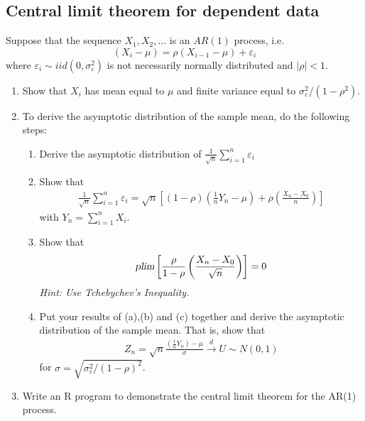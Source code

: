 \documentclass{article}
\begin{document}
\subsection{Central limit theorem for dependent data}
Suppose that the sequence $X_{1},X_{2},\ldots $ is an $AR(1)$ process, i.e.
$$\left( X_{i}-\mu \right) =\rho \left( X_{i-1}-\mu \right) +\varepsilon _{i}$$
where $\varepsilon _{i}\sim iid(0,\sigma _{\varepsilon }^{2})$ is not
necessarily normally distributed and $|\rho |<1$.

\begin{enumerate}
  \item Show that $X_i$ has mean equal to $\mu $ and finite variance equal to $\sigma_\varepsilon^2/(1-\rho^2)$.
  \item To derive the asymptotic distribution of the sample mean, do the following steps:
  \begin{enumerate}
    \item Derive the asymptotic distribution of $\frac{1}{\sqrt{n} } \sum_{i=1}^n \varepsilon_i$
    \item Show that
    \begin{align*}
    \frac{1}{\sqrt{n}} \sum_{i=1}^n \varepsilon_i = \sqrt{n}\left[(1-\rho)\left(\frac{1}{n}Y_n-\mu\right) + \rho\left(\frac{X_n - X_0}{n}\right)\right]
    \end{align*}
      with $Y_{n} =\sum_{i=1}^{n}X_{i}$.
    \item Show that
    \begin{align*}
        \textsl{plim}\left[\frac{\rho}{1-\rho}\left(\frac{X_n - X_0}{\sqrt{n}}\right)\right] = 0
    \end{align*}
    \emph{Hint: Use Tchebychev's Inequality.}
    \item Put your results of (a),(b) and (c) together and derive the asymptotic distribution of the sample mean. That is, show that
    \begin{align*}
    Z_{n} =\sqrt{n}\frac{\left( \frac{1}{n}Y_{n}\right) -\mu }{\sigma} \overset{d}{\rightarrow} U \sim N(0,1)
    \end{align*}
    for $\sigma=\sqrt{\sigma_\varepsilon^2/(1-\rho)^2}$.
  \end{enumerate}
  \item Write an R program to demonstrate the central limit theorem for the AR(1) process.
\end{enumerate}
\end{document}
